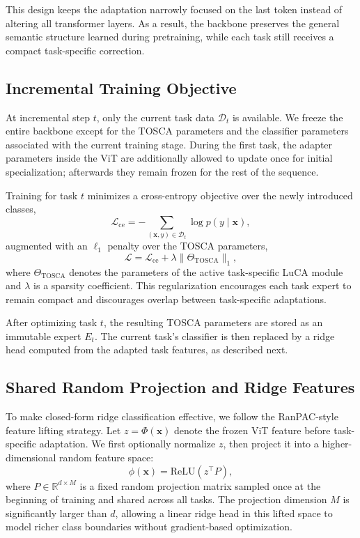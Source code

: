 \documentclass{article}
\begin{document}
This design keeps the adaptation narrowly focused on the last token instead
of altering all transformer layers. As a result, the backbone preserves the
general semantic structure learned during pretraining, while each task still
receives a compact task-specific correction.

\subsection{Incremental Training Objective}
\label{subsec:method-training}

At incremental step \(t\), only the current task data \(\mathcal{D}_t\) is
available. We freeze the entire backbone except for the TOSCA parameters and
the classifier parameters associated with the current training stage. During
the first task, the adapter parameters inside the ViT are additionally
allowed to update once for initial specialization; afterwards they remain
frozen for the rest of the sequence.

Training for task \(t\) minimizes a cross-entropy objective over the newly
introduced classes,
\begin{equation}
    \mathcal{L}_{\mathrm{ce}} =
    - \sum_{(\mathbf{x},y)\in\mathcal{D}_t}
    \log p(y \mid \mathbf{x}),
\end{equation}
augmented with an \(\ell_1\) penalty over the TOSCA parameters,
\begin{equation}
    \mathcal{L} =
    \mathcal{L}_{\mathrm{ce}} + \lambda \|\Theta_{\mathrm{TOSCA}}\|_1,
\end{equation}
where \(\Theta_{\mathrm{TOSCA}}\) denotes the parameters of the active
task-specific LuCA module and \(\lambda\) is a sparsity coefficient. This
regularization encourages each task expert to remain compact and discourages
overlap between task-specific adaptations.

After optimizing task \(t\), the resulting TOSCA parameters are stored as an
immutable expert \(E_t\). The current task's classifier is then replaced by
a ridge head computed from the adapted task features, as described next.

\subsection{Shared Random Projection and Ridge Features}
\label{subsec:method-ridge-features}

To make closed-form ridge classification effective, we follow the
RanPAC-style feature lifting strategy. Let \(z = \Phi(\mathbf{x})\) denote
the frozen ViT feature before task-specific adaptation. We first optionally
normalize \(z\), then project it into a higher-dimensional random feature
space:
\begin{equation}
    \phi(\mathbf{x}) = \mathrm{ReLU}(z^\top P),
\end{equation}
where \(P \in \mathbb{R}^{d \times M}\) is a fixed random projection matrix
sampled once at the beginning of training and shared across all tasks. The
projection dimension \(M\) is significantly larger than \(d\), allowing a
linear ridge head in this lifted space to model richer class boundaries
without gradient-based optimization.
\end{document}

